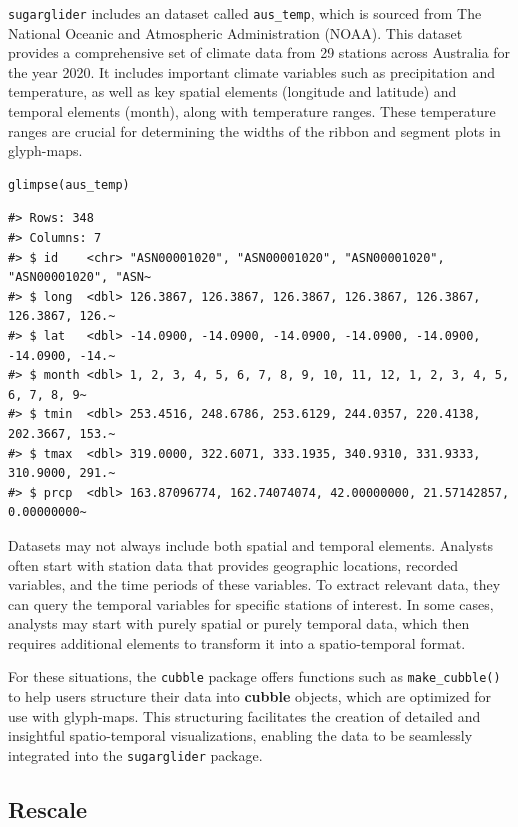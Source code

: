 \texttt{sugarglider} includes an dataset called \texttt{aus\_temp}, which is sourced from The National Oceanic and Atmospheric Administration (NOAA). This dataset provides a comprehensive set of climate data from 29 stations across Australia for the year 2020. It includes important climate variables such as precipitation and temperature, as well as key spatial elements (longitude and latitude) and temporal elements (month), along with temperature ranges. These temperature ranges are crucial for determining the widths of the ribbon and segment plots in glyph-maps.

\begin{verbatim}
glimpse(aus_temp)
\end{verbatim}

\begin{verbatim}
#> Rows: 348
#> Columns: 7
#> $ id    <chr> "ASN00001020", "ASN00001020", "ASN00001020", "ASN00001020", "ASN~
#> $ long  <dbl> 126.3867, 126.3867, 126.3867, 126.3867, 126.3867, 126.3867, 126.~
#> $ lat   <dbl> -14.0900, -14.0900, -14.0900, -14.0900, -14.0900, -14.0900, -14.~
#> $ month <dbl> 1, 2, 3, 4, 5, 6, 7, 8, 9, 10, 11, 12, 1, 2, 3, 4, 5, 6, 7, 8, 9~
#> $ tmin  <dbl> 253.4516, 248.6786, 253.6129, 244.0357, 220.4138, 202.3667, 153.~
#> $ tmax  <dbl> 319.0000, 322.6071, 333.1935, 340.9310, 331.9333, 310.9000, 291.~
#> $ prcp  <dbl> 163.87096774, 162.74074074, 42.00000000, 21.57142857, 0.00000000~
\end{verbatim}

Datasets may not always include both spatial and temporal elements. Analysts often start with station data that provides geographic locations, recorded variables, and the time periods of these variables. To extract relevant data, they can query the temporal variables for specific stations of interest. In some cases, analysts may start with purely spatial or purely temporal data, which then requires additional elements to transform it into a spatio-temporal format.

For these situations, the \texttt{cubble} package offers functions such as \texttt{make\_cubble()} to help users structure their data into \textbf{cubble} objects, which are optimized for use with glyph-maps. This structuring facilitates the creation of detailed and insightful spatio-temporal visualizations, enabling the data to be seamlessly integrated into the \texttt{sugarglider} package.

\hypertarget{rescale}{%
\subsection{Rescale}\label{rescale}}

